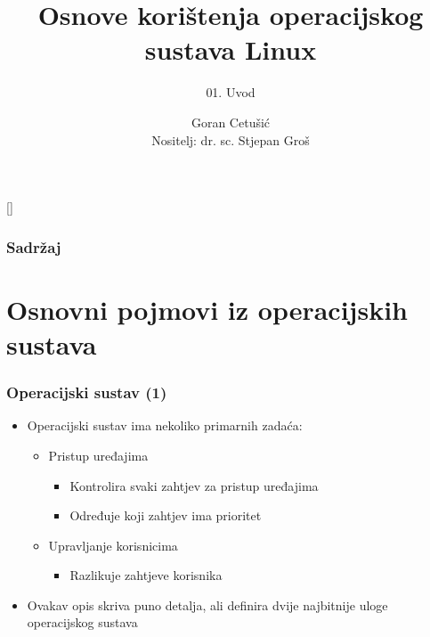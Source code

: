 \documentclass{beamer}
\title{Osnove korištenja operacijskog sustava Linux}
\subtitle{01. Uvod}
\author[Goran Cetušić]{Goran Cetušić\\{\small Nositelj: dr. sc. Stjepan Groš}}
\institute[FER]{Sveučilište u Zagrebu \\
				Fakultet elektrotehnike i računarstva}
\date{\todayiso}
\begin{document}
{
[] %

\begin{frame}
\maketitle
\end{frame}
}

\begin{frame}
\frametitle{Sadržaj}
\tableofcontents
\end{frame}

\section{Osnovni pojmovi iz operacijskih sustava}
\begin{frame}[t]
\frametitle{Operacijski sustav (1)}
\begin{itemize}
	\item Operacijski sustav ima nekoliko primarnih zadaća:
  \begin{itemize}
    \item Pristup uređajima
    \begin{itemize}
      \item Kontrolira svaki zahtjev za pristup uređajima
      \item Određuje koji zahtjev ima prioritet
    \end{itemize}
    \item Upravljanje korisnicima
    \begin{itemize}
      \item Razlikuje zahtjeve korisnika
    \end{itemize}
	\end{itemize}
  \item Ovakav opis skriva puno detalja, ali definira dvije najbitnije uloge
        operacijskog sustava 
\end{itemize}
\end{frame}
\end{document}
